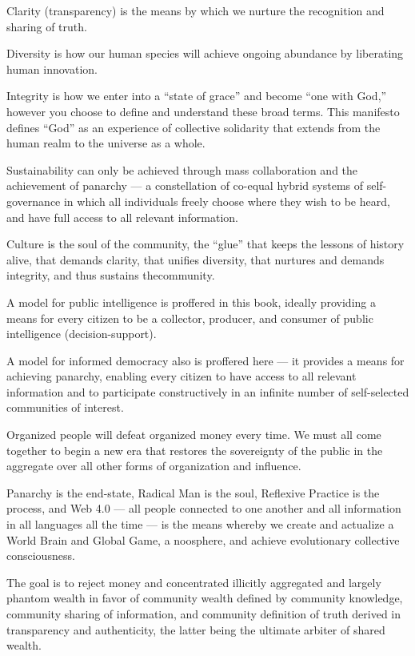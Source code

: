 \documentclass[letterpaper,12pt,english]{sphinxmanual}
\begin{document}
Clarity (transparency) is the means by which we nurture the recognition and sharing of truth.

Diversity is how our human species will achieve ongoing abundance by liberating human innovation.

Integrity is how we enter into a ``state of grace'' and become ``one with God,'' however you choose to define and understand these broad terms. This manifesto defines ``God'' as an experience of collective solidarity that extends from the human realm to the universe as a whole.

Sustainability can only be achieved through mass collaboration and the achievement of panarchy — a constellation of co-equal hybrid systems of self-governance in which all individuals freely choose where they wish to be heard, and have full access to all relevant information.

Culture is the soul of the community, the ``glue'' that keeps the lessons of history alive, that demands clarity, that unifies diversity, that nurtures and demands integrity, and thus sustains thecommunity.

A model for public intelligence is proffered in this book, ideally providing a means for every citizen to be a collector, producer, and consumer of public intelligence (decision-support).

A model for informed democracy also is proffered here — it provides a means for achieving panarchy, enabling every citizen to have access to all relevant information and to participate constructively in an infinite number of self-selected communities of interest.

Organized people will defeat organized money every time. We must all come together to begin a new era that restores the sovereignty of the public in the aggregate over all other forms of organization and influence.

Panarchy is the end-state, Radical Man is the soul, Reflexive Practice is the process, and Web 4.0 — all people connected to one another and all information in all languages all the time — is the means whereby we create and actualize a World Brain and Global Game, a noosphere, and achieve evolutionary collective consciousness.

The goal is to reject money and concentrated illicitly aggregated and largely phantom wealth in favor of community wealth defined by community knowledge, community sharing of information, and community definition of truth derived in transparency and authenticity, the latter being the ultimate arbiter of shared wealth.
\end{document}
